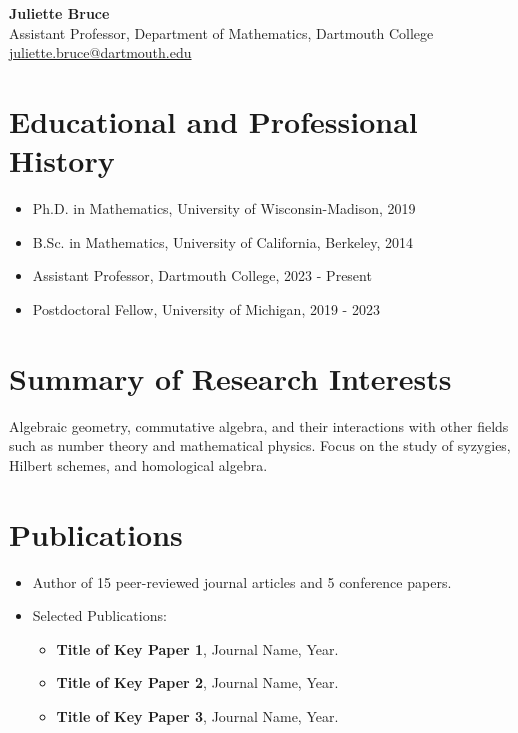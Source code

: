 \documentclass[letterpaper,11pt]{article}
\begin{document}
\begin{center}
    {\LARGE \textbf{Juliette Bruce}} \\
    Assistant Professor, Department of Mathematics, Dartmouth College \\
    \url{juliette.bruce@dartmouth.edu}
\end{center}

\section*{Educational and Professional History}
\begin{itemize}
    \item Ph.D. in Mathematics, University of Wisconsin-Madison, 2019
    \item B.Sc. in Mathematics, University of California, Berkeley, 2014
    \item Assistant Professor, Dartmouth College, 2023 - Present
    \item Postdoctoral Fellow, University of Michigan, 2019 - 2023
\end{itemize}

\section*{Summary of Research Interests}
Algebraic geometry, commutative algebra, and their interactions with other fields such as number theory and mathematical physics. Focus on the study of syzygies, Hilbert schemes, and homological algebra.

\section*{Publications}
\begin{itemize}
    \item Author of 15 peer-reviewed journal articles and 5 conference papers.
    \item Selected Publications:
        \begin{itemize}
            \item \textbf{Title of Key Paper 1}, Journal Name, Year.
            \item \textbf{Title of Key Paper 2}, Journal Name, Year.
            \item \textbf{Title of Key Paper 3}, Journal Name, Year.
        \end{itemize}
\end{itemize}
\end{document}
